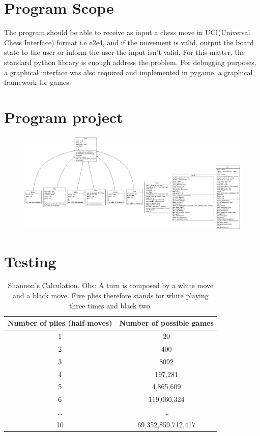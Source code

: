 \documentclass[10pt]{article}
\author{}
\title{}
\date{}
\begin{document}
\maketitle

\section{Program Scope}

The program should be able to receive as input a chess move in UCI(Universal
Chess Interface) format i.e
e2e4, and if the movement is valid, output the board state to the user or inform
the user the input isn't valid. For this matter, the standard python library is
enough address the problem. For debugging purposes, a graphical interface was
also required and implemented in pygame, a graphical framework for games.


\section{Program project}

\begin{figure}[H]
    \includegraphics[scale=0.2]{fig/classes_Chess.png}
\end{figure}


\section{Testing}

\begin{table}[h]
\center
\begin{tabular}{|c|c|}
\hline
\textbf{Number of plies (half-moves)}  & \textbf{Number of possible games}  \\
\hline
  1   & 20 \\
\hline
   2  &  400 \\
\hline
  3   & 8092 \\
\hline
4  & 197,281 \\
\hline
5   & 4,865,609 \\
\hline
6   & 119,060,324 \\
\hline
\ldots & \ldots \\
\hline
10 & 69,352,859,712,417 \\
\hline
\end{tabular}
\caption{Shannon's Calculation. Obs: A turn is composed by a white move and a black move. Five plies
therefore stands for white playing three times and black two.}
\end{table}
\end{document}
